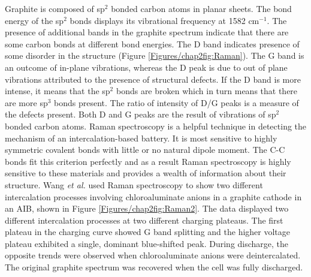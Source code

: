 Graphite is composed of sp$^2$ bonded carbon atoms in planar sheets. The bond energy of the sp$^2$ bonds displays its vibrational frequency at 1582 cm$^{-1}$. The presence of additional bands in the graphite spectrum indicate that there are some carbon bonds at different bond energies. The D band indicates presence of some disorder in the structure (Figure \ref{Figures/chap2fig:Raman}). The G band is an outcome of in-plane vibrations, whereas the D peak is due to out of plane vibrations attributed to the presence of structural defects. If the D band is more intense, it means that the sp$^2$ bonds are broken which in turn means that there are more sp$^3$ bonds present. The ratio of intensity of D/G peaks is a measure of the defects present. Both D and G peaks are the result of vibrations of sp$^2$ bonded carbon atoms.  
Raman spectroscopy is a helpful technique in detecting the mechanism of an intercalation-based battery. It is most sensitive to highly symmetric covalent bonds with little or no natural dipole moment. The C-C bonds fit this criterion perfectly and as a result Raman spectroscopy is highly sensitive to these materials and provides a wealth of information about their structure. Wang \textit{et al.} used Raman spectroscopy to show two different intercalation processes involving chloroaluminate anions in a graphite cathode in an AIB, shown in Figure \ref{Figures/chap2fig:Raman2}. The data displayed two different intercalation processes at two different charging plateaus. The first plateau in the charging curve showed G band splitting and the higher voltage plateau exhibited a single, dominant blue-shifted peak. During discharge, the opposite trends were observed when chloroaluminate anions were deintercalated. The original graphite spectrum was recovered when the cell was fully discharged\cite{wang_advanced_2017}. 

